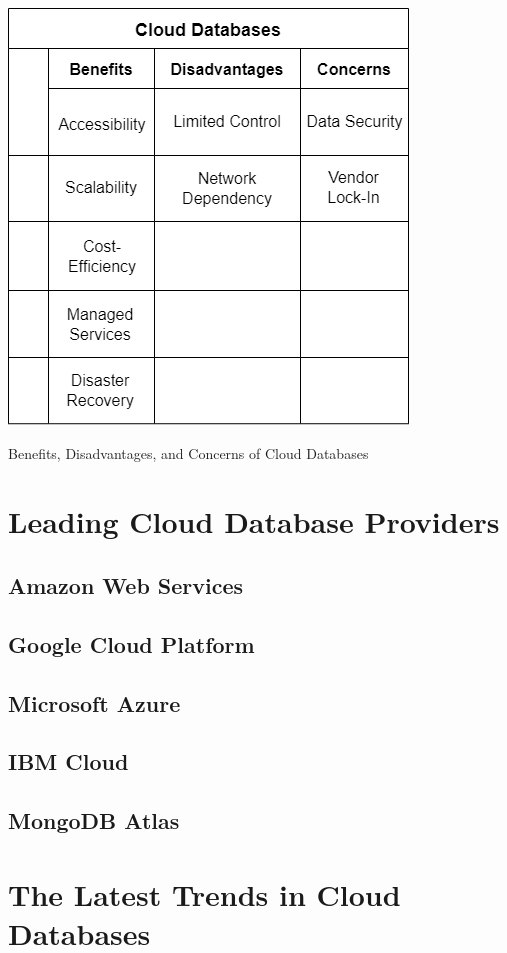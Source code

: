 \documentclass[12pt, a4paper]{article}
\begin{document}
    
    \begin{table}[t]
        \centering
        \includegraphics[width=0.65\linewidth]{images/benefits-disadvantages.png}
        \caption{Benefits, Disadvantages, and Concerns of Cloud Databases}
        \label{tab:benefits}
    \end{table}
\clearpage

\section{Leading Cloud Database Providers}
    \subsection{Amazon Web Services}
    \subsection{Google Cloud Platform}
    \subsection{Microsoft Azure}
    \subsection{IBM Cloud}
    \subsection{MongoDB Atlas}
\clearpage

\section{The Latest Trends in Cloud Databases}
\end{document}
